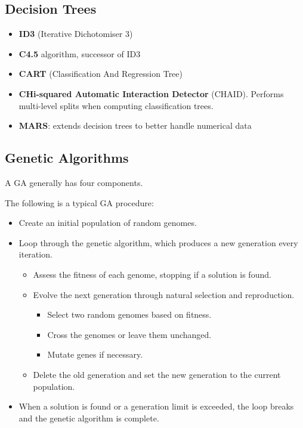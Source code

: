 \documentclass[conference]{IEEEtran}
\begin{document}
\subsection{Decision Trees}

\begin{itemize}
\item{\textbf{ID3} (Iterative Dichotomiser 3)}
\item{\textbf{C4.5} algorithm, successor of ID3}
\item{\textbf{CART} (Classification And Regression Tree)}
\item{\textbf{CHi-squared Automatic Interaction Detector }(CHAID). Performs multi-level splits when computing classification trees.}
\item{\textbf{MARS}: extends decision trees to better handle numerical data}
\end{itemize}



\subsection{Genetic Algorithms}


A GA generally has four components. 


The following is a typical GA procedure:

\begin{itemize}
\item{Create an initial population of random genomes.}
\item{Loop through the genetic algorithm, which produces a new generation every iteration.}

\begin{itemize}
\item{Assess the fitness of each genome, stopping if a solution is found.}
\item{Evolve the next generation through natural selection and reproduction.}

\begin{itemize}
\item{Select two random genomes based on fitness.}
\item{Cross the genomes or leave them unchanged.}
\item{Mutate genes if necessary.}
\end{itemize}
             
\item{Delete the old generation and set the new generation to the current population.}
\end{itemize}
            
\item{When a solution is found or a generation limit is exceeded, the loop breaks and the genetic algorithm is complete.}

\end{itemize} 
\end{document}
